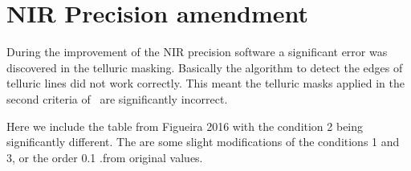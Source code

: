 
\chapter{NIR Precision amendment} %

\label{app:nir_prec_amendment}

During the improvement of the NIR precision software a significant error was discovered in the telluric masking. Basically the algorithm to detect the edges of telluric lines did not work correctly. This meant the telluric masks applied in the second criteria of~\citet{figueira_radial_2016} are significantly incorrect.

Here we include the table from Figueira 2016 with the condition 2 being significantly different.
The are some slight modifications of the conditions 1 and 3, or the order 0.1 .from original values.




%
%
%


\DTLsetseparator{ }

